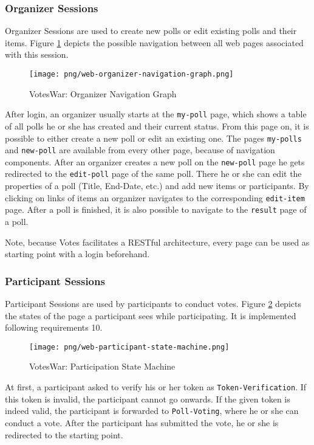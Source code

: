 \subsubsection{Organizer Sessions}
Organizer Sessions are used to create new polls or edit existing polls and their items.
Figure \ref{figure:web-organizer-navigation-graph} depicts the possible navigation between all web pages associated with this session. 

\begin{figure}[h]
\centering
\texttt{[image: png/web-organizer-navigation-graph.png]}
\caption{VotesWar: Organizer Navigation Graph}
\label{figure:web-organizer-navigation-graph}
\end{figure}

After login, an organizer usually starts at the \texttt{my-poll} page, which shows a table of all polls he or she has created and their current status.
From this page on, it is possible to either create a new poll or edit an existing one.
The pages \texttt{my-polls} and \texttt{new-poll} are available from every other page, because of navigation components.
After an organizer creates a new poll on the \texttt{new-poll} page he gets redirected to the \texttt{edit-poll} page of the same poll.
There he or she can edit the properties of a poll (Title, End-Date, etc.) and add new items or participants. 
By clicking on links of items an organizer navigates to the corresponding \texttt{edit-item} page.
After a poll is finished, it is also possible to navigate to the \texttt{result} page of a poll.

Note, because Votes facilitates a RESTful architecture, every page can be used as starting point with a login beforehand.

\subsubsection{Participant Sessions}
Participant Sessions are used by participants to conduct votes.
Figure \ref{figure:web-participation-state-machine} depicts the states of the page a participant sees while participating.
It is implemented following requirements 10. 

\begin{figure}[h]
\centering
\texttt{[image: png/web-participant-state-machine.png]}
\caption{VotesWar: Participation State Machine}
\label{figure:web-participation-state-machine}
\end{figure}

At first, a participant asked to verify his or her token as \texttt{Token-Verification}.
If this token is invalid, the participant cannot go onwards.
If the given token is indeed valid, the participant is forwarded to \texttt{Poll-Voting}, where he or she can conduct a vote.
After the participant has submitted the vote, he or she is redirected to the starting point.




